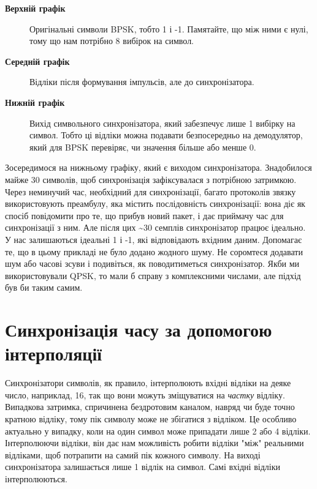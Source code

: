 \begin{description}
\item[\textbf{Верхній графік}]
Оригінальні символи BPSK, тобто 1 і -1. Пам\textquotesingle ятайте, що
між ними є нулі, тому що нам потрібно 8 вибірок на символ.
\item[\textbf{Середній графік}]
Відліки після формування імпульсів, але до синхронізатора.
\item[\textbf{Нижній графік}]
Вихід символьного синхронізатора, який забезпечує лише 1 вибірку на
символ. Тобто ці відліки можна подавати безпосередньо на демодулятор,
який для BPSK перевіряє, чи значення більше або менше 0.
\end{description}

\href{../_images/time-sync-output.svg}{}

Зосередимося на нижньому графіку, який є виходом синхронізатора.
Знадобилося майже 30 символів, щоб синхронізація зафіксувалася з
потрібною затримкою. Через неминучий час, необхідний для синхронізації,
багато протоколів зв\textquotesingle язку використовують преамбулу, яка
містить послідовність синхронізації: вона діє як спосіб повідомити про
те, що прибув новий пакет, і дає приймачу час для синхронізації з ним.
Але після цих \textasciitilde30 семплів синхронізатор працює ідеально. У
нас залишаються ідеальні 1 і -1, які відповідають вхідним даним.
Допомагає те, що в цьому прикладі не було додано жодного шуму. Не
соромтеся додавати шум або часові зсуви і подивіться, як поводитиметься
синхронізатор. Якби ми використовували QPSK, то мали б справу з
комплексними числами, але підхід був би таким самим.

\section{Синхронізація часу за допомогою
інтерполяції}\label{ux441ux438ux43dux445ux440ux43eux43dux456ux437ux430ux446ux456ux44f-ux447ux430ux441ux443-ux437ux430-ux434ux43eux43fux43eux43cux43eux433ux43eux44e-ux456ux43dux442ux435ux440ux43fux43eux43bux44fux446ux456ux457}

Синхронізатори символів, як правило, інтерполюють вхідні відліки на
деяке число, наприклад, 16, так що вони можуть зміщуватися на
\emph{частку} відліку. Випадкова затримка, спричинена бездротовим
каналом, навряд чи буде точно кратною відліку, тому пік символу може не
збігатися з відліком. Це особливо актуально у випадку, коли на один
символ може припадати лише 2 або 4 відліки. Інтерполюючи відліки, він
дає нам можливість робити відліки "між" реальними відліками, щоб
потрапити на самий пік кожного символу. На виході синхронізатора
залишається лише 1 відлік на символ. Самі вхідні відліки інтерполюються.

